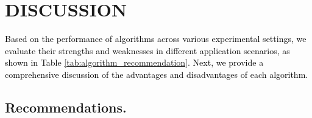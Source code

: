 \documentclass[sigconf, nonacm, pdfa]{acmart}
\begin{document}
{	

	
	
	\section{DISCUSSION}
	\textcolor{black}{Based on the performance of algorithms across various experimental settings, we evaluate their strengths and weaknesses in different application scenarios, as shown in Table \ref{tab:algorithm_recommendation}. Next, we provide a comprehensive discussion of the advantages and disadvantages of each algorithm.}
	
	
	
	\subsection{Recommendations.}
	
}
\end{document}
